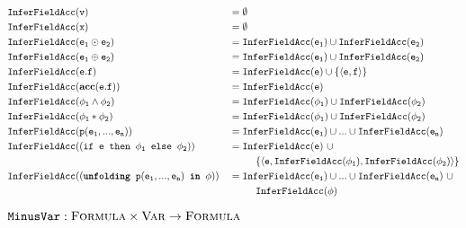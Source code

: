 \documentclass {llncs}
\begin{document}
  \begin{scenter}
        \begin{alignat*}{2}
        	    & \inferFieldAcc{v}
            &&= \emptyset \\
            & \inferFieldAcc{x}
            &&= \emptyset \\
            & \inferFieldAcc{e_1 \odot e_2}
            &&= \inferFieldAcc{e_1} \cup \inferFieldAcc{e_2} \\
            & \inferFieldAcc{e_1 \oplus e_2}
            &&= \inferFieldAcc{e_1} \cup \inferFieldAcc{e_2} \\
            & \inferFieldAcc{e.f}
            &&= \inferFieldAcc{e} \cup \mathtt{\left\{ \langle e,f \rangle \right\}} \\
            & \inferFieldAcc{\phiAcc{e}{f}}
            &&= \inferFieldAcc{e} \\
            & \inferFieldAcc{\phi_1 \wedge \phi_2}
            &&= \inferFieldAcc{\phi_1} \cup \inferFieldAcc{\phi_2} \\
            & \inferFieldAcc{\phi_1 \ast \phi_2}
            &&= \inferFieldAcc{\phi_1} \cup \inferFieldAcc{\phi_2} \\
            & \inferFieldAcc{p(e_1,...,e_n)}
            &&= \inferFieldAcc{e_1} \cup ... \cup \inferFieldAcc{e_n} \\
            & \inferFieldAcc{\phiCond{e}{\phi_1}{\phi_2}}
            &&= \inferFieldAcc{e} ~\cup \\
            &&& ~~~~~~~~\mathtt{\left\{ \langle e,\inferFieldAcc{\phi_1},\inferFieldAcc{\phi_2} \rangle \right\}} \\
            & \inferFieldAcc{\unfolding{p(e_1,..., e_n)}{\phi}}
            &&= \inferFieldAcc{e_1} \cup ... \cup \inferFieldAcc{e_n} ~\cup \\
            &&& ~~~~~~~~\inferFieldAcc{\phi} \\
        \end{alignat*}
    \end{scenter}


\noindent $\texttt{MinusVar}: \setFormula \times \setVar \rightarrow \setFormula$
\end{document}
